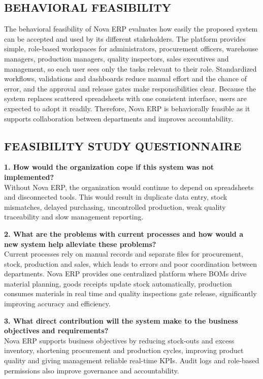 \documentclass[12pt,a4paper]{report}
\begin{document}
\subsection{BEHAVIORAL FEASIBILITY}
The behavioral feasibility of Nova ERP evaluates how easily the proposed system can be accepted and used by its different stakeholders. The platform provides simple, role-based workspaces for administrators, procurement officers, warehouse managers, production managers, quality inspectors, sales executives and management, so each user sees only the tasks relevant to their role. Standardized workflows, validations and dashboards reduce manual effort and the chance of error, and the approval and release gates make responsibilities clear. Because the system replaces scattered spreadsheets with one consistent interface, users are expected to adopt it readily. Therefore, Nova ERP is behaviorally feasible as it supports collaboration between departments and improves accountability.

\subsection{FEASIBILITY STUDY QUESTIONNAIRE}
\textbf{1. How would the organization cope if this system was not implemented?}\\
Without Nova ERP, the organization would continue to depend on spreadsheets and disconnected tools. This would result in duplicate data entry, stock mismatches, delayed purchasing, uncontrolled production, weak quality traceability and slow management reporting.

\textbf{2. What are the problems with current processes and how would a new system help alleviate these problems?}\\
Current processes rely on manual records and separate files for procurement, stock, production and sales, which leads to errors and poor coordination between departments. Nova ERP provides one centralized platform where BOMs drive material planning, goods receipts update stock automatically, production consumes materials in real time and quality inspections gate release, significantly improving accuracy and efficiency.

\textbf{3. What direct contribution will the system make to the business objectives and requirements?}\\
Nova ERP supports business objectives by reducing stock-outs and excess inventory, shortening procurement and production cycles, improving product quality and giving management reliable real-time KPIs. Audit logs and role-based permissions also improve governance and accountability.
\end{document}
